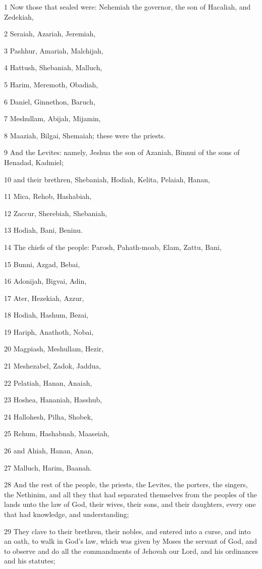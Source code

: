 \par 1 Now those that sealed were: Nehemiah the governor, the son of Hacaliah, and Zedekiah,
\par 2 Seraiah, Azariah, Jeremiah,
\par 3 Pashhur, Amariah, Malchijah,
\par 4 Hattush, Shebaniah, Malluch,
\par 5 Harim, Meremoth, Obadiah,
\par 6 Daniel, Ginnethon, Baruch,
\par 7 Meshullam, Abijah, Mijamin,
\par 8 Maaziah, Bilgai, Shemaiah; these were the priests.
\par 9 And the Levites: namely, Jeshua the son of Azaniah, Binnui of the sons of Henadad, Kadmiel;
\par 10 and their brethren, Shebaniah, Hodiah, Kelita, Pelaiah, Hanan,
\par 11 Mica, Rehob, Hashabiah,
\par 12 Zaccur, Sherebiah, Shebaniah,
\par 13 Hodiah, Bani, Beninu.
\par 14 The chiefs of the people: Parosh, Pahath-moab, Elam, Zattu, Bani,
\par 15 Bunni, Azgad, Bebai,
\par 16 Adonijah, Bigvai, Adin,
\par 17 Ater, Hezekiah, Azzur,
\par 18 Hodiah, Hashum, Bezai,
\par 19 Hariph, Anathoth, Nobai,
\par 20 Magpiash, Meshullam, Hezir,
\par 21 Meshezabel, Zadok, Jaddua,
\par 22 Pelatiah, Hanan, Anaiah,
\par 23 Hoshea, Hananiah, Hasshub,
\par 24 Hallohesh, Pilha, Shobek,
\par 25 Rehum, Hashabnah, Maaseiah,
\par 26 and Ahiah, Hanan, Anan,
\par 27 Malluch, Harim, Baanah.
\par 28 And the rest of the people, the priests, the Levites, the porters, the singers, the Nethinim, and all they that had separated themselves from the peoples of the lands unto the law of God, their wives, their sons, and their daughters, every one that had knowledge, and understanding;
\par 29 They clave to their brethren, their nobles, and entered into a curse, and into an oath, to walk in God's law, which was given by Moses the servant of God, and to observe and do all the commandments of Jehovah our Lord, and his ordinances and his statutes;

